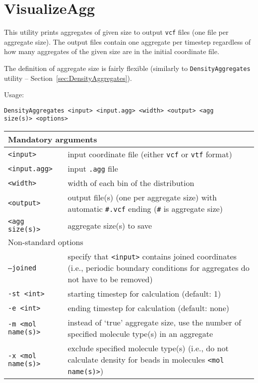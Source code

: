 \section{VisualizeAgg} \label{sec:VisualizeAgg}

This utility prints aggregates of given size to output \texttt{vcf} files
(one file per aggregate size). The output files contain one aggregate per
timestep regardless of how many aggregates of the given size are in the
initial coordinate file.

The definition of aggregate size is fairly flexible (similarly to
\texttt{DensityAggregates} utility -- Section~\ref{sec:DensityAggregates}).

Usage:

\vspace{1em}
\noindent
\texttt{DensityAggregates <input> <input.agg> <width> <output> <agg \\
size(s)> <options>}

\noindent
\begin{longtable}{p{}p{}}
  \toprule
  \multicolumn{2}{l}{Mandatory arguments} \\
  \midrule
  \texttt{<input>} & input coordinate file (either \texttt{vcf} or
    \texttt{vtf} format) \\
  \texttt{<input.agg>} & input \texttt{.agg} file \\
  \texttt{<width>} & width of each bin of the distribution \\
  \texttt{<output>} & output file(s) (one per aggregate size) with
    automatic \texttt{\#.vcf} ending (\texttt{\#} is aggregate size) \\
  \texttt{<agg size(s)>} & aggregate size(s) to save \\
  \toprule
  \multicolumn{2}{l}{Non-standard options} \\
  \midrule
  \texttt{--joined} & specify that \texttt{<input>} contains joined
    coordinates (i.e., periodic boundary conditions for aggregates do not
    have to be removed) \\
  \texttt{-st <int>} & starting timestep for calculation (default: 1) \\
  \texttt{-e <int>} & ending timestep for calculation (default: none) \\
  \texttt{-m <mol name(s)>} & instead of `true' aggregate size, use the number
    of specified molecule type(s) in an aggregate \\
  \texttt{-x <mol name(s)>} & exclude specified molecule type(s) (i.e., do
    not calculate density for beads in molecules \texttt{<mol name(s)>}) \\
  \bottomrule
\end{longtable}
